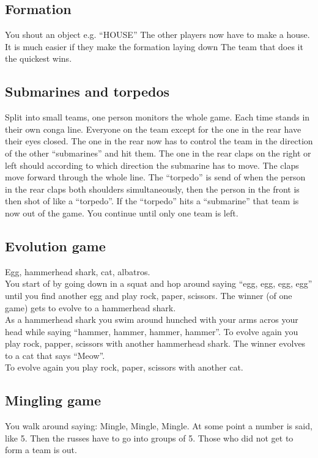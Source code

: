 \documentclass[../../../main.tex]{subfiles}
\begin{document}
\begin{multicols}{2}
\subsection*{Formation}
    You shout an object e.g. ``HOUSE''
    The other players now have to make a house.
    It is much easier if they make the formation laying down
    The team that does it the quickest wins.
    
\subsection*{Submarines and torpedos}
    Split into small teams, one person monitors the whole game. Each time stands in their own conga line. Everyone on the team except for the one in the rear have their eyes closed. The one in the rear now has to control the team in the direction of the other ``submarines'' and hit them. The one in the rear claps on the right or left should according to which direction the submarine has to move. The claps move forward through the whole line. The ``torpedo'' is send of when the person in the rear claps both shoulders simultaneously, then the person in the front is then shot of like a ``torpedo''. If the ``torpedo'' hits a ``submarine'' that team is now out of the game. You continue until only one team is left.

\subsection*{Evolution game}
    Egg, hammerhead shark, cat, albatros.\\
    You start of by going down in a squat and hop around saying ``egg, egg, egg, egg'' until you find another egg and play rock, paper, scissors. The winner (of one game) gets to evolve to a hammerhead shark.\\
    As a hammerhead shark you swim around hunched with your arms acros your head while saying ``hammer, hammer, hammer, hammer''. To evolve again you play rock, papper, scissors with another hammerhead shark. The winner evolves to a cat that says ``Meow''. \\
    To evolve again you play rock, paper, scissors with another cat.

\subsection*{Mingling game}
    You walk around saying: Mingle, Mingle, Mingle. At some point a number is said, like 5. Then the russes have to go into groups of 5. Those who did not get to form a team is out.


\end{multicols}
\end{document}

